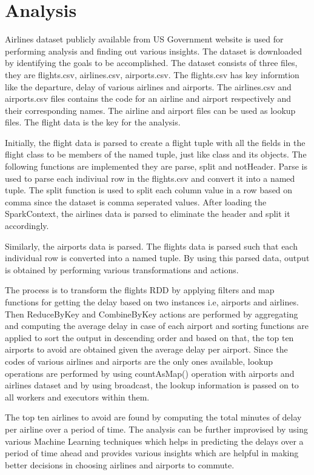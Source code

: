 \documentclass[9pt,twocolumn,twoside]{../../styles/osajnl}
\begin{document}
\section{Analysis}

Airlines dataset publicly available from US Government website is used
for performing analysis and finding out various insights. The dataset
is downloaded by identifying the goals to be accomplished. The dataset
consists of three files, they are flights.csv, airlines.csv,
airports.csv.  The flights.csv has key informtion like the departure,
delay of various airlines and airports. The airlines.csv and
airports.csv files contains the code for an airline and airport
respectively and their corresponding names.  The airline and airport
files can be used as lookup files. The flight data is the key for the analysis.

Initially, the flight data is parsed to create a flight tuple with all
the fields in the flight class to be members of the named tuple, just
like class and its objects. The following functions are implemented
they are parse, split and notHeader. Parse is used to parse each
indiviual row in the flights.csv and convert it into a named
tuple. The split function is used to split each column value in a row
based on comma since the dataset is comma seperated values. After
loading the SparkContext, the airlines data is parsed to eliminate the
header and split it accordingly.

Similarly, the airports data is parsed.  The flights data is parsed
such that each individual row is converted into a named tuple.  By
using this parsed data, output is obtained by performing various
transformations and actions.

The process is to transform the flights RDD by applying filters and
map functions for getting the delay based on two instances i.e,
airports and airlines. Then ReduceByKey and CombineByKey actions are
performed by aggregating and computing the average delay in case of
each airport and sorting functions are applied to sort the output in
descending order and based on that, the top ten airports to avoid are
obtained given the average delay per airport. Since the codes of
various airlines and airports are the only ones available, lookup
operations are performed by using countAsMap() operation with airports
and airlines dataset and by using broadcast, the lookup information is
passed on to all workers and executors within them.

The top ten airlines to avoid are found by computing the total minutes
of delay per airline over a period of time. The analysis can
be further improvised by using various Machine Learning techniques
which helps in predicting the delays over a period of time ahead and
provides various insights which are helpful in making better decisions
in choosing airlines and airports to commute.
\end{document}
